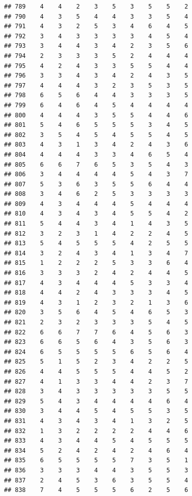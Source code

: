 \documentclass[
]{article}
\begin{document}
\begin{verbatim}
## 789    4    4    2    3    5    3    5    5    2
## 790    4    3    5    4    4    3    3    5    4
## 791    4    3    2    5    3    4    6    4    5
## 792    3    4    3    3    3    3    4    5    4
## 793    3    4    4    3    4    2    3    5    6
## 794    2    3    3    3    5    2    4    4    4
## 795    4    2    4    3    3    5    5    4    4
## 796    3    3    4    3    4    2    4    3    5
## 797    4    4    4    3    2    3    5    3    5
## 798    6    5    6    4    4    3    3    3    5
## 799    6    4    6    4    5    4    4    4    4
## 800    4    4    4    3    5    5    4    4    6
## 801    5    4    6    5    5    5    3    4    5
## 802    3    5    4    5    4    5    5    4    5
## 803    4    3    1    3    4    2    4    3    6
## 804    4    4    4    3    3    4    6    5    4
## 805    6    6    7    6    5    3    5    4    3
## 806    3    4    4    4    4    5    4    3    7
## 807    5    3    6    3    5    5    6    4    4
## 808    3    4    6    2    5    3    3    3    3
## 809    4    3    4    4    4    5    4    4    4
## 810    4    3    4    3    4    5    5    4    2
## 811    5    4    4    3    4    1    4    3    5
## 812    3    2    3    1    4    2    2    4    5
## 813    5    4    5    5    5    4    2    5    5
## 814    3    2    4    3    4    1    3    4    7
## 815    1    2    2    2    5    3    3    6    4
## 816    3    3    3    2    4    2    4    4    5
## 817    4    3    4    4    4    5    3    3    4
## 818    4    4    2    4    3    3    3    4    5
## 819    4    3    1    2    3    2    1    3    6
## 820    3    5    6    4    5    4    6    5    3
## 821    2    3    2    3    3    3    5    4    5
## 822    6    6    7    7    6    4    5    6    3
## 823    6    6    5    6    4    3    5    6    3
## 824    6    5    5    5    5    6    5    6    4
## 825    5    1    5    2    3    4    2    2    5
## 826    4    4    5    5    5    4    4    5    2
## 827    4    1    3    3    4    4    2    3    7
## 828    3    4    3    3    3    3    3    5    5
## 829    5    4    3    4    4    4    4    6    4
## 830    3    4    4    5    4    5    5    3    5
## 831    4    3    4    3    4    1    3    2    5
## 832    1    3    2    2    2    2    4    4    6
## 833    4    3    4    4    5    4    5    5    5
## 834    5    2    4    2    4    2    4    6    4
## 835    6    5    5    5    5    7    3    5    1
## 836    3    3    3    4    4    3    5    5    3
## 837    2    4    5    3    6    3    5    5    4
## 838    7    4    5    5    5    6    2    5    6

\end{verbatim}
\end{document}
